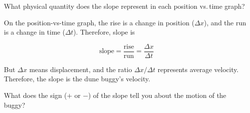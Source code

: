 \documentclass[]{exam}
\begin{document}
\begin{questions}



    






\question
What physical quantity does the slope represent in each position vs.\,time graph?

\ifprintanswers
{\color{red}
On the position-vs-time graph, the rise is a change in position ($\Delta x$), and the run is a change in time ($\Delta t$). Therefore, slope is

\begin{equation*}
    \text{slope} = \mathrm{\frac{rise}{run}} = \frac{\Delta x}{\Delta t}
\end{equation*}

But $\Delta x$ means displacement, and the ratio $\Delta x/\Delta t$ represents average velocity. Therefore, the slope is the dune buggy's velocity.
}
\else
\fillwithlines{14mm}
\fi

\question
What does the sign ($+$ or $-$) of the slope tell you about the motion of the buggy?


\end{questions}
\end{document}
